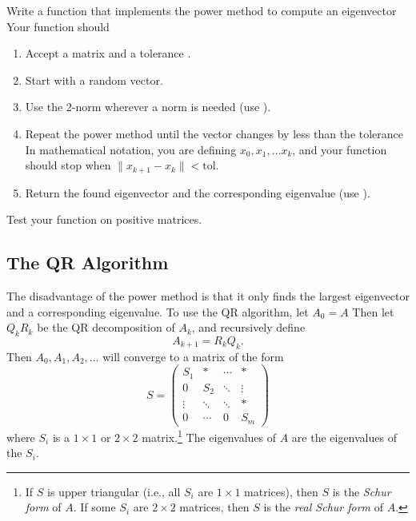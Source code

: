 \begin{problem} %
Write a function that implements the power method to compute an eigenvector
Your function should
\begin{enumerate}
\item Accept a matrix and a tolerance .
\item Start with a random vector.
\item Use the 2-norm wherever a norm is needed (use ).
\item Repeat the power method until the vector changes by less than the tolerance
In mathematical notation, you are defining $x_0, x_1, \ldots x_k$, and your function should stop when $\|x_{k+1}-x_k\| < \text{tol}$.
\item Return the found eigenvector and the corresponding eigenvalue (use ).
\end{enumerate}
Test your function on positive matrices.
\end{problem}

\subsection*{The QR Algorithm} %

The disadvantage of the power method is that it only finds the largest eigenvector and a corresponding eigenvalue.
To use the QR algorithm, let $A_0=A$
Then let $Q_kR_k$ be the QR decomposition of $A_k$, and recursively define
\[
A_{k+1}=R_kQ_k.
\]
Then $A_0, A_1, A_2, \ldots $ will converge to a matrix of the form
\begin{equation*}
\label{eq:Schur form}
S =
     \begin{pmatrix}
          S_1 &* & \cdots & * \\
           0     &S_2  &  \ddots & \vdots \\
           \vdots  & \ddots & \ddots & *  \\
           0 & \cdots & 0 & S_m
    \end{pmatrix}
\end{equation*}
where $S_i$ is a $1\times1$ or $2\times2$ matrix.\footnote{If $S$ is upper triangular (i.e., all $S_i$ are $1\times1$ matrices), then $S$ is the \emph{Schur form} of $A$.
If some $S_i$ are $2\times2$ matrices, then $S$ is the \emph{real Schur form} of $A$.}
The eigenvalues of $A$ are the eigenvalues of the $S_i$.

